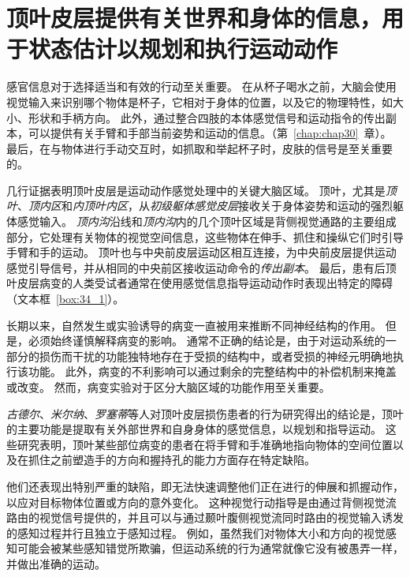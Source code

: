 \section{顶叶皮层提供有关世界和身体的信息，用于状态估计以规划和执行运动动作}

感官信息对于选择适当和有效的行动至关重要。
在从杯子喝水之前，大脑会使用视觉输入来识别哪个物体是杯子，它相对于身体的位置，以及它的物理特性，如大小、形状和手柄方向。
此外，通过整合四肢的本体感觉信号和运动指令的传出副本，可以提供有关手臂和手部当前姿势和运动的信息。（第~\ref{chap:chap30}~章）。
最后，在与物体进行手动交互时，如抓取和举起杯子时，皮肤的信号是至关重要的。


几行证据表明顶叶皮层是运动动作感觉处理中的关键大脑区域。
顶叶，尤其是\textit{顶叶}、\textit{顶内区}和\textit{内顶叶内区}，从\textit{初级躯体感觉皮层}接收关于身体姿势和运动的强烈躯体感觉输入。
\textit{顶内沟}沿线和\textit{顶内沟}内的几个顶叶区域是背侧视觉通路的主要组成部分，它处理有关物体的视觉空间信息，这些物体在伸手、抓住和操纵它们时引导手臂和手的运动。
顶叶也与中央前皮层运动区相互连接，为中央前皮层提供运动感觉引导信号，并从相同的中央前区接收运动命令的\textit{传出副本}。
最后，患有后顶叶皮层病变的人类受试者通常在使用感觉信息指导运动动作时表现出特定的障碍（文本框~\ref{box:34_1}）。



\begin{proposition}[后顶叶皮层的病变研究导致使用感觉信息指导行动的缺陷] \label{box:34_1}
	
	\quad \quad 长期以来，自然发生或实验诱导的病变一直被用来推断不同神经结构的作用。
	但是，必须始终谨慎解释病变的影响。
	通常不正确的结论是，由于对运动系统的一部分的损伤而干扰的功能独特地存在于受损的结构中，或者受损的神经元明确地执行该功能。
	此外，病变的不利影响可以通过剩余的完整结构中的补偿机制来掩盖或改变。
	然而，病变实验对于区分大脑区域的功能作用至关重要。
	
	\quad \quad \textit{古德尔}、\textit{米尔纳}、\textit{罗塞蒂}等人对顶叶皮层损伤患者的行为研究得出的结论是，顶叶的主要功能是提取有关外部世界和自身身体的感觉信息，以规划和指导运动。
	这些研究表明，顶叶某些部位病变的患者在将手臂和手准确地指向物体的空间位置以及在抓住之前塑造手的方向和握持孔的能力方面存在特定缺陷。
	
	\quad \quad 他们还表现出特别严重的缺陷，即无法快速调整他们正在进行的伸展和抓握动作，以应对目标物体位置或方向的意外变化。
	这种视觉行动指导是由通过背侧视觉流路由的视觉信号提供的，并且可以与通过颞叶腹侧视觉流同时路由的视觉输入诱发的感知过程并行且独立于感知过程。
	例如，虽然我们对物体大小和方向的视觉感知可能会被某些感知错觉所欺骗，但运动系统的行为通常就像它没有被愚弄一样，并做出准确的运动。
	
\end{proposition}



